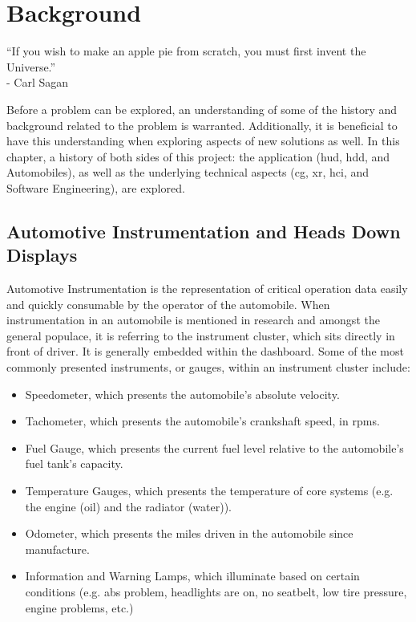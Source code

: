 \chapter{Background}
\label{chap:background}

\begin{center}
    ``If you wish to make an apple pie from scratch, you must first invent the Universe.'' \\
    - Carl Sagan \cite{Sagan2011}
\end{center}

\par Before a problem can be explored, an understanding of some of the history and background related to the problem is warranted. Additionally, it is beneficial to have this understanding when exploring aspects of new solutions as well. In this chapter, a history of both sides of this project: the application (\gls{hud}, \gls{hdd}, and Automobiles), as well as the underlying technical aspects (\gls{cg}, \gls{xr}, \gls{hci}, and Software Engineering), are explored.

\section{Automotive Instrumentation and Heads Down Displays}
    \par Automotive Instrumentation is the representation of critical operation data easily and quickly consumable by the operator of the automobile. When instrumentation in an automobile is mentioned in research and amongst the general populace, it is referring to the instrument cluster, which sits directly in front of driver. It is generally embedded within the dashboard. Some of the most commonly presented instruments, or gauges, within an instrument cluster include:

    \begin{itemize}
        \item Speedometer, which presents the automobile's absolute velocity.
        \item Tachometer, which presents the automobile's crankshaft speed, in \glspl{rpm}.
        \item Fuel Gauge, which presents the current fuel level relative to the automobile's fuel tank's capacity.
        \item Temperature Gauges, which presents the temperature of core systems (e.g. the engine (oil) and the radiator (water)).
        \item Odometer, which presents the miles driven in the automobile since manufacture.
        \item Information and Warning Lamps, which illuminate based on certain conditions (e.g. \gls{abs} problem, headlights are on, no seatbelt, low tire pressure, engine problems, etc.)
    \end{itemize}

